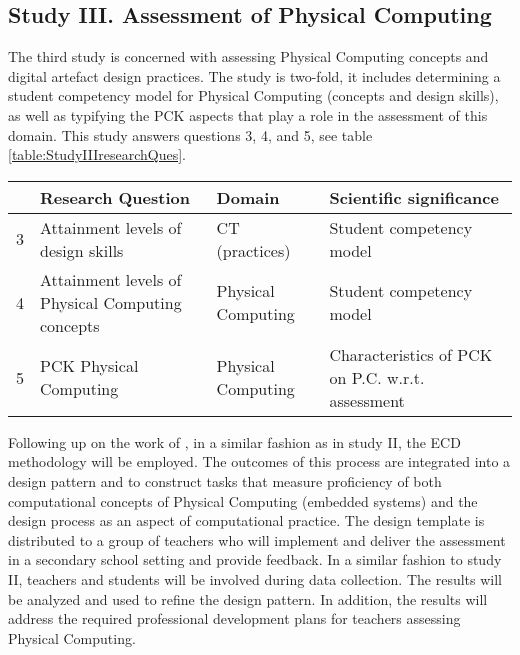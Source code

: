 


\subsection{Study III. Assessment of Physical Computing} %

The third study is concerned with assessing Physical Computing concepts and digital artefact design practices. The study is two-fold, it includes determining a student competency model for Physical Computing (concepts and design skills), as well as typifying the PCK aspects that play a role in the assessment of this domain. This study answers questions 3, 4, and 5, see table \ref{table:StudyIIIresearchQues}.

\begin{table*}
  \centering
\begin{tabular}{|c|p{50mm}|l|p{48mm}|}
   \hline
    &\textbf{Research Question} & \textbf{Domain} & \textbf{Scientific significance}\\
  \hline

  3 & Attainment levels of design skills & CT (practices) & Student competency model  \\ \hline
  4 & Attainment levels of Physical Computing concepts & Physical Computing & Student competency model\\ \hline
  5 & PCK Physical Computing & Physical Computing & Characteristics of PCK on P.C. w.r.t. assessment\\
  \hline
\end{tabular}
\caption{Overview study III: Assessment of Physical Computing}\label{table:StudyIIIresearchQues}
\end{table*}


Following up on the work of \cite{mareen2018PhysComp}, in a similar fashion as in study II, the ECD methodology will be employed. The outcomes of this process are integrated into a design pattern and to construct tasks that measure proficiency of both computational concepts of Physical Computing (embedded systems) and the design process as an aspect of computational practice. The design template is distributed to a group of teachers who will implement and deliver the assessment in a secondary school setting and provide feedback. In a similar fashion to study II, teachers and students will be involved during data collection. The results will be analyzed and used to refine the design pattern. In addition, the results will address the required professional development plans for teachers assessing Physical Computing.



